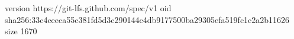 version https://git-lfs.github.com/spec/v1
oid sha256:33c4ceeca55c381fd5d3c290144c4db9177500ba29305efa519fc1c2a2b11626
size 1670
